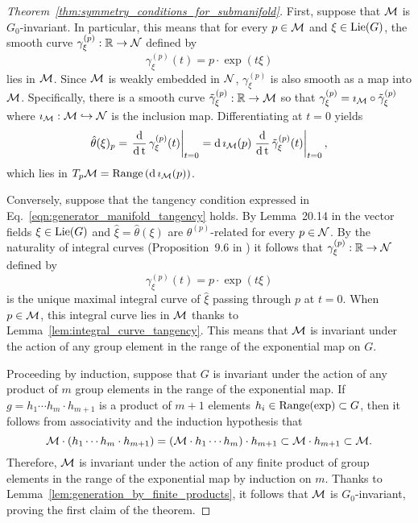 \documentclass[twoside,11pt]{article}
\begin{document}
\begin{proof}[Theorem~\ref{thm:symmetry_conditions_for_submanifold}]
First, suppose that ${\mathcal{M}}$ is $G_0$-invariant.
In particular, this means that for every $p\in{\mathcal{M}}$ and $\xi\in\operatorname{Lie}(G)$, the smooth curve $\gamma_{\xi}^{(p)}:\mathbb{R} \to {\mathcal{N}}$ defined by
\begin{equation}
    \gamma_{\xi}^{(p)}(t) = p \cdot \exp(t\xi)
\end{equation}
lies in ${\mathcal{M}}$.
Since ${\mathcal{M}}$ is weakly embedded in ${\mathcal{N}}$, $\gamma_{\xi}^{(p)}$ is also smooth as a map into ${\mathcal{M}}$.
Specifically, there is a smooth curve $\tilde{\gamma}_{\xi}^{(p)}:\mathbb{R} \to {\mathcal{M}}$ so that $\gamma_{\xi}^{(p)} = \imath_{{\mathcal{M}}} \circ \tilde{\gamma}_{\xi}^{(p)}$ where $\imath_{{\mathcal{M}}} : {\mathcal{M}} \hookrightarrow {\mathcal{N}}$ is the inclusion map.
Differentiating at $t=0$ yields
\begin{equation}
    \hat{\theta}(\xi)_p
    = \left.\operatorname{\frac{\operatorname{\mathrm{d}}}{\operatorname{\mathrm{d}} t}} \gamma_{\xi}^{(p)}(t) \right\vert_{t=0}
    = \operatorname{\mathrm{d}} \imath_{{\mathcal{M}}}(p) \left.\operatorname{\frac{\operatorname{\mathrm{d}}}{\operatorname{\mathrm{d}} t}} \tilde{\gamma}_{\xi}^{(p)}(t) \right\vert_{t=0},
\end{equation}
which lies in $T_p {\mathcal{M}} = \operatorname{Range}\left( \operatorname{\mathrm{d}} \imath_{{\mathcal{M}}}(p) \right)$.

Conversely, suppose that the tangency condition expressed in Eq.~\ref{eqn:generator_manifold_tangency} holds.
By Lemma~20.14 in \cite{Lee2013introduction} the vector fields $\xi \in \operatorname{Lie}(G)$ and $\hat{\xi} = \hat{\theta}(\xi)$ are $\theta^{(p)}$-related for every $p\in{\mathcal{N}}$.
By the naturality of integral curves (Proposition~9.6 in \cite{Lee2013introduction}) it follows that $\gamma_{\xi}^{(p)}:\mathbb{R} \to {\mathcal{N}}$ defined by
\begin{equation}
    \gamma_{\xi}^{(p)}(t) = p \cdot \exp(t\xi)
\end{equation}
is the unique maximal integral curve of $\hat{\xi}$ passing through $p$ at $t=0$.
When $p\in{\mathcal{M}}$, this integral curve lies in ${\mathcal{M}}$ thanks to Lemma~\ref{lem:integral_curve_tangency}.
This means that ${\mathcal{M}}$ is invariant under the action of any group element in the range of the exponential map on $G$.

Proceeding by induction, suppose that $G$ is invariant under the action of any product of $m$ group elements in the range of the exponential map.
If $g = h_1 \cdots h_m \cdot h_{m+1}$ is a product of $m+1$ elements $h_i \in \operatorname{Range}(\exp)\subset G$,
then it follows from associativity and the induction hypothesis that
\begin{equation}
    {\mathcal{M}} \cdot (h_1 \cdots h_m \cdot h_{m+1}) = ({\mathcal{M}} \cdot h_1 \cdots h_m) \cdot h_{m+1} \subset {\mathcal{M}} \cdot h_{m+1} \subset {\mathcal{M}}.
\end{equation}
Therefore, ${\mathcal{M}}$ is invariant under the action of any finite product of group elements in the range of the exponential map by induction on $m$.
Thanks to Lemma~\ref{lem:generation_by_finite_products}, it follows that ${\mathcal{M}}$ is $G_0$-invariant, proving the first claim of the theorem.


\end{proof}
\end{document}

